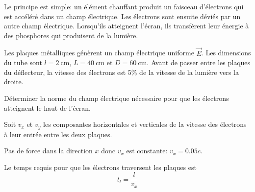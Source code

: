   Le principe est simple: un élément chauffant produit un faisceau d'électrons
  qui est accéléré dans un champ électrique. Les électrons sont ensuite déviés
  par un autre champ électrique. Lorsqu'ils atteignent l'écran, ils transfèrent
  leur énergie à des phosphores qui produisent de la lumière.

  \begin{center}
  \end{center}

  Les plaques métalliques génèrent un champ électrique uniforme $\vec{E}$.
  Les dimensions du tube sont $l = \SI{2}{\centi\meter}$, $L =
  \SI{40}{\centi\meter}$ et $D = \SI{60}{\centi\meter}$.  Avant de passer entre
  les plaques du déflecteur, la vitesse des électrons est
  5\% de la vitesse de la lumière vers la droite.

  Déterminer la norme du champ électrique nécessaire pour que les électrons
  atteignent le haut de l'écran.


  Soit $v_x$ et $v_y$ les composantes horizontales et verticales de la vitesse
  des électrons à leur entrée entre les deux plaques.

  Pas de force dans la direction $x$ donc $v_x$ est constante: $v_x = 0.05c$.

  Le temps requis pour que les électrons traversent les plaques est
  \[
    t_l = \frac{l}{v_x}
  \]

